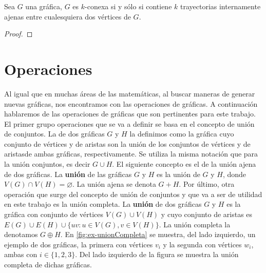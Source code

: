 
\begin{teorema}
    \label{teo:menger}
Sea $G$ una gr\'afica, $G$ es $k$-conexa si y s\'olo si contiene $k$
trayectorias internamente ajenas entre cualesquiera dos v\'ertices de $G$.
\end{teorema}

\begin{proof}
    
\end{proof}

\section{Operaciones}
\label{sec:operaciones}

Al igual que en muchas \'areas de las matem\'aticas, al buscar maneras de
generar nuevas gr\'aficas, nos encontramos con las operaciones de gr\'aficas. A
continuaci\'on hablaremos de las operaciones de gr\'aficas que son pertinentes
para este trabajo. El primer grupo operaciones que se va a definir se basa en el
concepto de uni\'on de conjuntos. La  de dos gr\'aficas $G$ y
$H$ la definimos como la gr\'afica cuyo conjunto de v\'ertices y de aristas son
la uni\'on de los conjuntos de v\'ertices  y de aristasde ambas gr\'aficas,
respectivamente. Se utiliza la misma notaci\'on que para la uni\'on conjuntos,
es decir $G \cup H$. El siguiente concepto es el de la uni\'on ajena de dos
gr\'aficas. La \textbf{uni\'on}  de las gr\'aficas $G$
y $H$ es la uni\'on de $G$ y $H$, donde $V(G) \cap V(H) = \varnothing$. La
uni\'on ajena se denota $G + H$. Por \'ultimo, otra operaci\'on que surge del
concepto de uni\'on de conjuntos y que va a ser de utilidad en este trabajo es
la uni\'on completa. La \textbf{uni\'on}  de dos
gr\'aficas $G$ y $H$ es la gr\'afica con conjunto de v\'ertices $V(G) \cup V(H)$
y cuyo conjunto de aristas es $E(G) \cup E(H) \cup \{uv \colon u \in V(G), v \in
V(H) \}$. La uni\'on completa la denotamos $G \oplus H$. En \cref{fig:ex-unionCompleta} se muestra, del lado izquierdo, un
ejemplo de dos gr\'aficas, la primera con v\'ertices $v_i$ y la segunda con
v\'ertices $w_i$, ambas con $i \in \{1, 2 ,3\}$. Del lado izquierdo de la figura
se muestra la uni\'on completa de dichas gr\'aficas.

